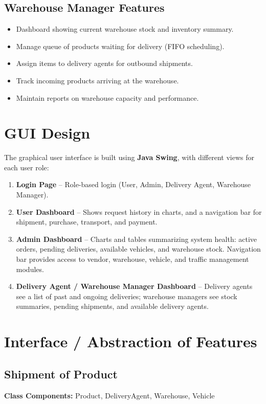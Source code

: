 \documentclass[12pt,a4paper]{article}
\begin{document}
\subsection{Warehouse Manager Features}
\begin{itemize}[noitemsep]
  \item Dashboard showing current warehouse stock and inventory summary.
  \item Manage queue of products waiting for delivery (FIFO scheduling).
  \item Assign items to delivery agents for outbound shipments.
  \item Track incoming products arriving at the warehouse.
  \item Maintain reports on warehouse capacity and performance.
\end{itemize}

\section{GUI Design}
The graphical user interface is built using \textbf{Java Swing}, with different views for each user role:

\begin{enumerate}
  \item \textbf{Login Page} – Role-based login (User, Admin, Delivery Agent, Warehouse Manager).
  \item \textbf{User Dashboard} – Shows request history in charts, and a navigation bar for shipment, purchase, transport, and payment.
  \item \textbf{Admin Dashboard} – Charts and tables summarizing system health: active orders, pending deliveries, available vehicles, and warehouse stock. Navigation bar provides access to vendor, warehouse, vehicle, and traffic management modules.
  \item \textbf{Delivery Agent / Warehouse Manager Dashboard} – Delivery agents see a list of past and ongoing deliveries; warehouse managers see stock summaries, pending shipments, and available delivery agents.
\end{enumerate}

\section{Interface / Abstraction of Features}

\subsection{Shipment of Product}
\textbf{Class Components:} Product, DeliveryAgent, Warehouse, Vehicle
\end{document}
